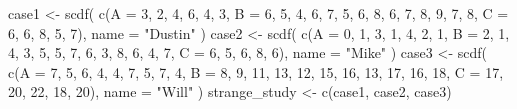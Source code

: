 \documentclass[
]{book}
\newenvironment{Shaded}{\begin{snugshade}}{\end{snugshade}}
\newcommand{\AttributeTok}[1]{\textcolor[rgb]{0.77,0.63,0.00}{#1}}
\newcommand{\DecValTok}[1]{\textcolor[rgb]{0.00,0.00,0.81}{#1}}
\newcommand{\FunctionTok}[1]{\textcolor[rgb]{0.00,0.00,0.00}{#1}}
\newcommand{\NormalTok}[1]{#1}
\newcommand{\OtherTok}[1]{\textcolor[rgb]{0.56,0.35,0.01}{#1}}
\newcommand{\StringTok}[1]{\textcolor[rgb]{0.31,0.60,0.02}{#1}}
\begin{document}
\begin{Shaded}
\begin{Highlighting}[]
\NormalTok{case1 }\OtherTok{\textless{}{-}} \FunctionTok{scdf}\NormalTok{(}
  \FunctionTok{c}\NormalTok{(}\AttributeTok{A =} \DecValTok{3}\NormalTok{, }\DecValTok{2}\NormalTok{, }\DecValTok{4}\NormalTok{, }\DecValTok{6}\NormalTok{, }\DecValTok{4}\NormalTok{, }\DecValTok{3}\NormalTok{, }
    \AttributeTok{B =} \DecValTok{6}\NormalTok{, }\DecValTok{5}\NormalTok{, }\DecValTok{4}\NormalTok{, }\DecValTok{6}\NormalTok{, }\DecValTok{7}\NormalTok{, }\DecValTok{5}\NormalTok{, }\DecValTok{6}\NormalTok{, }\DecValTok{8}\NormalTok{, }\DecValTok{6}\NormalTok{, }\DecValTok{7}\NormalTok{, }\DecValTok{8}\NormalTok{, }\DecValTok{9}\NormalTok{, }\DecValTok{7}\NormalTok{, }\DecValTok{8}\NormalTok{, }
    \AttributeTok{C =} \DecValTok{6}\NormalTok{, }\DecValTok{6}\NormalTok{, }\DecValTok{8}\NormalTok{, }\DecValTok{5}\NormalTok{, }\DecValTok{7}\NormalTok{), }
  \AttributeTok{name =} \StringTok{"Dustin"}
\NormalTok{)}
\NormalTok{case2 }\OtherTok{\textless{}{-}} \FunctionTok{scdf}\NormalTok{(}
  \FunctionTok{c}\NormalTok{(}\AttributeTok{A =} \DecValTok{0}\NormalTok{, }\DecValTok{1}\NormalTok{, }\DecValTok{3}\NormalTok{, }\DecValTok{1}\NormalTok{, }\DecValTok{4}\NormalTok{, }\DecValTok{2}\NormalTok{, }\DecValTok{1}\NormalTok{, }
    \AttributeTok{B =} \DecValTok{2}\NormalTok{, }\DecValTok{1}\NormalTok{, }\DecValTok{4}\NormalTok{, }\DecValTok{3}\NormalTok{, }\DecValTok{5}\NormalTok{, }\DecValTok{5}\NormalTok{, }\DecValTok{7}\NormalTok{, }\DecValTok{6}\NormalTok{, }\DecValTok{3}\NormalTok{, }\DecValTok{8}\NormalTok{, }\DecValTok{6}\NormalTok{, }\DecValTok{4}\NormalTok{, }\DecValTok{7}\NormalTok{, }
    \AttributeTok{C =} \DecValTok{6}\NormalTok{, }\DecValTok{5}\NormalTok{, }\DecValTok{6}\NormalTok{, }\DecValTok{8}\NormalTok{, }\DecValTok{6}\NormalTok{), }
  \AttributeTok{name =} \StringTok{"Mike"}
\NormalTok{)}
\NormalTok{case3 }\OtherTok{\textless{}{-}} \FunctionTok{scdf}\NormalTok{(}
  \FunctionTok{c}\NormalTok{(}\AttributeTok{A =} \DecValTok{7}\NormalTok{, }\DecValTok{5}\NormalTok{, }\DecValTok{6}\NormalTok{, }\DecValTok{4}\NormalTok{, }\DecValTok{4}\NormalTok{, }\DecValTok{7}\NormalTok{, }\DecValTok{5}\NormalTok{, }\DecValTok{7}\NormalTok{, }\DecValTok{4}\NormalTok{,}
    \AttributeTok{B =} \DecValTok{8}\NormalTok{, }\DecValTok{9}\NormalTok{, }\DecValTok{11}\NormalTok{, }\DecValTok{13}\NormalTok{, }\DecValTok{12}\NormalTok{, }\DecValTok{15}\NormalTok{, }\DecValTok{16}\NormalTok{, }\DecValTok{13}\NormalTok{, }\DecValTok{17}\NormalTok{, }\DecValTok{16}\NormalTok{, }\DecValTok{18}\NormalTok{,}
    \AttributeTok{C =} \DecValTok{17}\NormalTok{, }\DecValTok{20}\NormalTok{, }\DecValTok{22}\NormalTok{, }\DecValTok{18}\NormalTok{, }\DecValTok{20}\NormalTok{), }
  \AttributeTok{name =} \StringTok{"Will"}
\NormalTok{)}
\NormalTok{strange\_study }\OtherTok{\textless{}{-}} \FunctionTok{c}\NormalTok{(case1, case2, case3)}
\end{Highlighting}
\end{Shaded}
\end{document}
